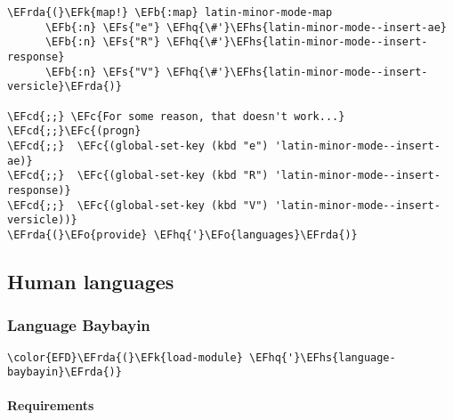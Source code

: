 \documentclass[a4wide,10pt]{article}
\newcommand{\EFc}[1]{\textcolor{EFc}{#1}} %
\newcommand{\EFcd}[1]{\textcolor{EFcd}{#1}} %
\newcommand{\EFs}[1]{\textcolor{EFs}{#1}} %
\newcommand{\EFk}[1]{\textcolor{EFk}{#1}} %
\newcommand{\EFb}[1]{\textcolor{EFb}{#1}} %
\newcommand{\EFo}[1]{\textcolor{EFo}{#1}} %
\newcommand{\EFhq}[1]{\textcolor{EFhq}{#1}} %
\newcommand{\EFhs}[1]{\textcolor{EFhs}{#1}} %
\newcommand{\EFrda}[1]{\textcolor{EFrda}{#1}} %
\begin{document}
\begin{Code}
\begin{Verbatim}
\EFrda{(}\EFk{map!} \EFb{:map} latin-minor-mode-map
      \EFb{:n} \EFs{"e"} \EFhq{\#'}\EFhs{latin-minor-mode--insert-ae}
      \EFb{:n} \EFs{"R"} \EFhq{\#'}\EFhs{latin-minor-mode--insert-response}
      \EFb{:n} \EFs{"V"} \EFhq{\#'}\EFhs{latin-minor-mode--insert-versicle}\EFrda{)}

\EFcd{;;} \EFc{For some reason, that doesn't work...}
\EFcd{;;}\EFc{(progn}
\EFcd{;;}  \EFc{(global-set-key (kbd "e") 'latin-minor-mode--insert-ae)}
\EFcd{;;}  \EFc{(global-set-key (kbd "R") 'latin-minor-mode--insert-response)}
\EFcd{;;}  \EFc{(global-set-key (kbd "V") 'latin-minor-mode--insert-versicle))}
\EFrda{(}\EFo{provide} \EFhq{'}\EFo{languages}\EFrda{)}
\end{Verbatim}
\end{Code}
\subsection{Human languages}
\label{sec:org780d977}
\subsubsection{Language Baybayin}
\label{sec:org3ae3090}
\begin{Code}
\begin{Verbatim}
\color{EFD}\EFrda{(}\EFk{load-module} \EFhq{'}\EFhs{language-baybayin}\EFrda{)}
\end{Verbatim}
\end{Code}
\paragraph{Requirements}
\label{sec:org36d2441}
\end{document}
